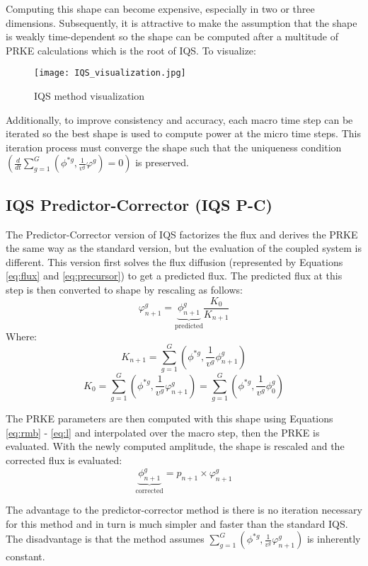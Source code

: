 \documentclass[10pt]{scrartcl}
\newcommand{\be}{\begin{equation}}
\newcommand{\ee}{\end{equation}}
\begin{document}
Computing this shape can become expensive, especially in two or three dimensions.  Subsequently, it is attractive to make the assumption that the shape is weakly time-dependent so the shape can be computed after a multitude of PRKE calculations which is the root of IQS.  To visualize:
\begin{figure}[!htbp]
\texttt{[image: IQS\_visualization.jpg]}
\caption{IQS method visualization}
\end{figure}

Additionally, to improve consistency and accuracy, each macro time step can be iterated so the best shape is used to compute power at the micro time steps.  This iteration process must converge the shape such that the uniqueness condition $(\frac{d}{dt}\sum_{g=1}^G\left(\phi^{*g},\frac{1}{v^g}\varphi^g\right)=0)$ is preserved.

\subsection{IQS Predictor-Corrector (IQS P-C)}

The Predictor-Corrector version of IQS factorizes the flux and derives the PRKE the same way as the standard version, but the evaluation of the coupled system is different.  This version first solves the flux diffusion (represented by Equations \ref{eq:flux} and \ref{eq:precursor}) to get a predicted flux.  The predicted flux at this step is then converted to shape by rescaling as follows:
\be
\varphi^g_{n+1} = \underbrace{\phi^g_{n+1}}_{\text{predicted}} \frac{K_0}{K_{n+1}}
\label{eq:rescale}
\ee
Where:
\be
K_{n+1} =\sum_{g=1}^G\left(\phi^{*g},\frac{1}{v^g}\phi^g_{n+1}\right)
\ee
\be
K_{0} =\sum_{g=1}^G\left(\phi^{*g},\frac{1}{v^g}\varphi^g_{n+1}\right)=\sum_{g=1}^G\left(\phi^{*g},\frac{1}{v^g}\phi^g_{0}\right)
\ee

The PRKE parameters are then computed with this shape using Equations \ref{eq:rmb} - \ref{eq:l} and interpolated over the macro step, then the PRKE is evaluated.  With the newly computed amplitude, the shape is rescaled and the corrected flux is evaluated:
\be
\underbrace{\phi^g_{n+1}}_{\text{corrected}} = p_{n+1} \times \varphi^g_{n+1}
\ee

The advantage to the predictor-corrector method is there is no iteration necessary for this method and in turn is much simpler and faster than the standard IQS.  The disadvantage is that the method assumes $\sum_{g=1}^G\left(\phi^{*g},\frac{1}{v^g}\varphi^g_{n+1}\right)$ is inherently constant.
\end{document}
